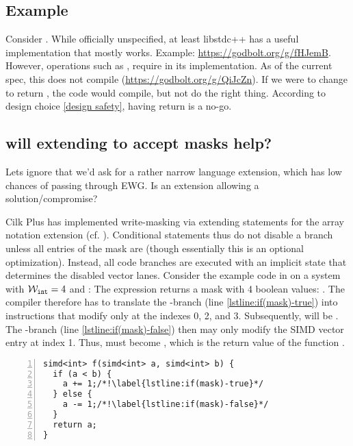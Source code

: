 \subsection{Example }
Consider .
While officially unspecified, at least libstdc++ has a useful implementation that mostly works.
Example: \url{https://godbolt.org/g/fHJemB}.
However, operations such as , require  in its implementation.
As of the current spec, this does not compile (\url{https://godbolt.org/g/QiJcZn}).
If we were to change  to return \bool, the code would compile, but not do the right thing.
According to design choice \ref{design safety}, having  return \bool is a no-go.

\subsection{will extending  to accept masks help?}
Lets ignore that we'd ask for a rather narrow language extension, which has low chances of passing through EWG.
Is an extension allowing  a solution/compromise?

Cilk Plus has implemented write-masking via extending  statements for the array notation extension (cf. \textcite{Intel.Cilk.Array}).
Conditional statements thus do not disable a branch unless all entries of the mask are \false (though essentially this is an optional optimization).
Instead, all code branches are executed with an implicit state that determines the disabled vector lanes.
Consider the example code in  on a system with $\mathcal{W}_{\mathtt{int}} = 4$ and :
The expression  returns a mask with 4 boolean values: \code{\{\true, \false, \true, \true{}\}}.
The compiler therefore has to translate the -branch (line \ref{lstline:if(mask)-true}) into instructions that modify  only at the indexes 0, 2, and 3.
Subsequently,  will be .
The -branch (line \ref{lstline:if(mask)-false}) then may only modify the \ac{SIMD} vector entry at index 1.
Thus,  must become , which is the return value of the function .
\begin{lstlisting}[style=Vc,numbers=left,float,label=lst:if(mask),caption={
  Example code relying on overloaded semantics for \code{if} statements with mask arguments.
}]
simd<int> f(simd<int> a, simd<int> b) {
  if (a < b) {
    a += 1;/*!\label{lstline:if(mask)-true}*/
  } else {
    a -= 1;/*!\label{lstline:if(mask)-false}*/
  }
  return a;
}
\end{lstlisting}

